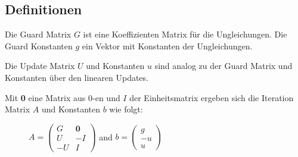 \subsection{Definitionen}

\begin{frame}
	\begin{definition}
		Die Guard Matrix $G$ ist eine Koeffizienten Matrix f\"ur die Ungleichungen. Die Guard Konstanten $g$ ein Vektor mit Konstanten der Ungleichungen.
	\end{definition}
	\begin{definition}
		Die Update Matrix $U$ und Konstanten $u$ sind analog zu der Guard Matrix und Konstanten \"uber den linearen Updates.
	\end{definition}
	\begin{definition}
		Mit \textbf{0} eine Matrix aus 0-en und $I$ der Einheitsmatrix ergeben sich die Iteration Matrix $A$ und Konstanten $b$ wie folgt:
		\vspace*{-1em}
		\begin{figure}[H]
			\centering
			$A = \begin{pmatrix} G & \textbf{0} \\ U & -I \\ -U & I \end{pmatrix}$ and $b = \begin{pmatrix} g \\ -u \\ u \end{pmatrix}$
		\end{figure}
	\end{definition}
\end{frame}

